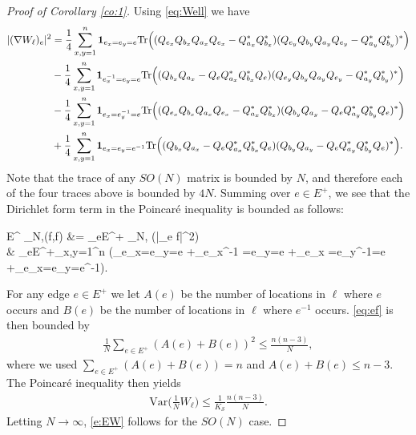 \documentclass[11pt,UTF-8,reqno]{amsart}
\numberwithin{equation}{section}
\def\var{{\mathrm{Var}}}
\def\tr{\mathrm {tr}}
\def\cE{{\mathcal E}}
\def\cS{{\mathcal S}}
\def\1{{\mathbf{1}}}
\def\leq{\leqslant}
\def\tr{\mathrm {tr}}
\def\tr{{\rm Tr}}
\def\leq{\leqslant}
\begin{document}
\begin{proof}[Proof of Corollary \ref{co:1}]
	
	Using \eqref{eq:Well} we have
	\begin{align*}
		|(\nabla  W_\ell)_{e}|^2
		&=\frac14\sum_{x,y=1}^n\1_{e_x=e_y=e}
		\tr\Big((Q_{e_x}Q_{b_x}Q_{a_x}Q_{e_x}-Q_{a_x}^*Q_{b_x}^*)(Q_{e_y}Q_{b_y}Q_{a_y}Q_{e_y}-Q_{a_y}^*Q_{b_y}^*)^*\Big)
		\\
		&-\frac14\sum_{x,y=1}^n\1_{e_x^{-1}=e_y=e}
		\tr\Big((Q_{b_x}Q_{a_x}-Q_{e}Q_{a_x}^*Q_{b_x}^*Q_{e})(Q_{e_y}Q_{b_y}Q_{a_y}Q_{e_y}-Q_{a_y}^*Q_{b_y}^*)^*\Big)
		\\
		&-\frac14\sum_{x,y=1}^n\1_{e_x=e_y^{-1}=e}
		\tr\Big((Q_{e_x}Q_{b_x}Q_{a_x}Q_{e_x}-Q_{a_x}^*Q_{b_x}^*)(Q_{b_y}Q_{a_y}-Q_{e}Q_{a_y}^*Q_{b_y}^*Q_{e})^*\Big)
		\\
		&+\frac14\sum_{x,y=1}^n\1_{e_x=e_y=e^{-1}}
		\tr\Big((Q_{b_x}Q_{a_x}-Q_{e}Q_{a_x}^*Q_{b_x}^*Q_{e})(Q_{b_y}Q_{a_y}-Q_{e}Q_{a_y}^*Q_{b_y}^*Q_{e})^*\Big).
	\end{align*}
	Note that the trace of any $SO(N)$ matrix is bounded by $N$, and therefore each of the four traces above is bounded by $4N$.
	Summing over $e\in E^+$, we see that the Dirichlet form
	term in the Poincar\'e inequality is bounded as follows:
	\begin{equs}\label{eq:ef}
		\cE^{ \mu_{N,\beta}}(f,f) &= \sum_{e\in E^+}  \mu_{N,\beta}   (|\nabla_{e} f|^2)  \\
		&\leq
		\sum_{e\in E^+}\sum_{x,y=1}^n
		\Big(\1_{e_x=e_y=e}
		+\1_{e_x^{-1} =e_y=e}
		+\1_{e_x =e_y^{-1}=e}
		+\1_{e_x=e_y=e^{-1}}\Big).
	\end{equs}
	For any  edge $e\in E^+$ we let $A(e)$ be the number of locations in $\ell$ where $e$ occurs and  $B(e)$ be the number of locations in $\ell$ where $e^{-1}$ occurs.
	\eqref{eq:ef} is then bounded by
	\begin{align*}
		\frac{1}{N}\sum_{e\in E^+}(A(e)+B(e))^2\leq \frac{n(n-3)}{N},
	\end{align*}
	where we used $\sum_{e\in E^+}(A(e)+B(e))=n$ and $A(e)+B(e)\leq n-3$.
	The Poincar\'e inequality then yields
	\begin{align*}
		\var\Big(\frac1NW_\ell\Big)\leq \frac1{K_\cS }\frac{n(n-3)}{N}.
	\end{align*}
	Letting $N\to\infty$, \eqref{e:EW} follows for the $SO(N)$ case.
	

\end{proof}
\end{document}
